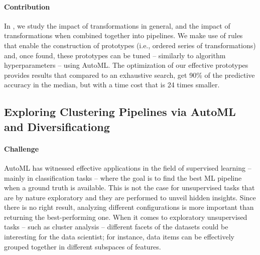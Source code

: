 \paragraph{Contribution} In , we study the impact of transformations in general, and the impact of transformations when combined together into pipelines.
We make use of rules that enable the construction of prototypes (i.e., ordered series of transformations) and, once found, these prototypes can be tuned -- similarly to algorithm hyperparameters -- using AutoML.
The optimization of our effective prototypes provides results that compared to an exhaustive search, get 90\% of the predictive accuracy in the median, but with a time cost that is 24 times smaller.

\subsection*{Exploring Clustering Pipelines via AutoML and Diversificationg}


\paragraph{Challenge} AutoML has witnessed effective applications in the field of supervised learning -- mainly in classification tasks --  where the goal is to find the best ML pipeline when a ground truth is available.
This is not the case for unsupervised tasks that are by nature exploratory and they are performed to unveil hidden insights.
Since there is no right result, analyzing different configurations is more important than returning the best-performing one.
When it comes to exploratory unsupervised tasks -- such as cluster analysis --  different facets of the datasets could be interesting for the data scientist; for instance, data items can be effectively grouped together in different subspaces of features.

